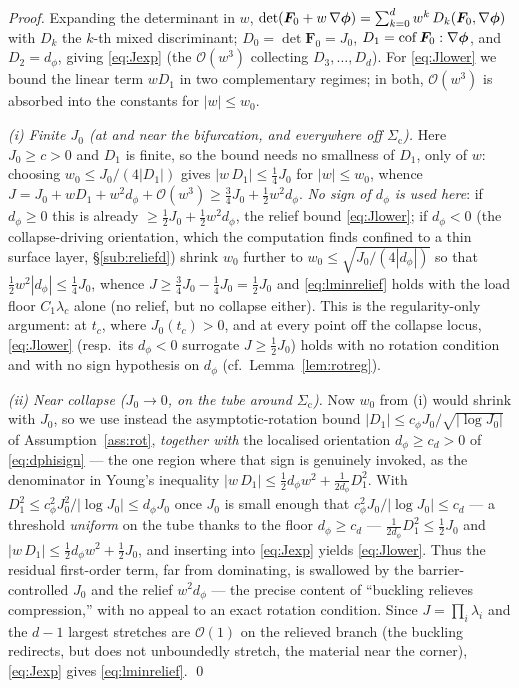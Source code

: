 \begin{proof}
    Expanding the determinant in $w$, $\det(\bm{F}_0+w\,\nabla\bm{\phi})=\sum_{k=0}^{d}w^k\,D_k(\bm{F}_0,\nabla\bm{\phi})$
    with $D_k$ the $k$-th mixed discriminant; $D_0=\det\bm{F}_0=J_0$, $D_1=\operatorname{cof}\bm{F}_0:\nabla\bm{\phi}$, and
    $D_2=d_\phi$, giving \eqref{eq:Jexp} (the $\mathcal{O}(w^3)$ collecting $D_3,\dots,D_d$). For \eqref{eq:Jlower} we
    bound the linear term $wD_1$ in two complementary regimes; in both, $\mathcal{O}(w^3)$ is absorbed into the constants
    for $|w|\le w_0$.

    \emph{(i) Finite $J_0$ (at and near the bifurcation, and everywhere off $\Sigma_{\mathrm{c}}$).} Here $J_0\ge c>0$ and
    $D_1$ is finite, so the bound needs no smallness of $D_1$, only of $w$: choosing $w_0\le J_0/(4|D_1|)$ gives
    $|w\,D_1|\le\tfrac14 J_0$ for $|w|\le w_0$, whence $J = J_0 + w D_1 + w^2 d_\phi+\mathcal{O}(w^3)\ge \tfrac34 J_0 +
    \tfrac12 w^2 d_\phi$. \emph{No sign of $d_\phi$ is used here}: if $d_\phi\ge0$ this is already $\ge\tfrac12
    J_0+\tfrac12 w^2 d_\phi$, the relief bound \eqref{eq:Jlower}; if $d_\phi<0$ (the collapse-driving orientation, which the
    computation finds confined to a thin surface layer, \S\ref{sub:reliefd}) shrink $w_0$ further to $w_0\le\sqrt{J_0/(4
    |d_\phi|)}$ so that $\tfrac12 w^2|d_\phi|\le\tfrac14 J_0$, whence $J\ge\tfrac34 J_0-\tfrac14 J_0=\tfrac12 J_0$ and
    \eqref{eq:lminrelief} holds with the load floor $C_1\lambda_c$ alone (no relief, but no collapse either). This is the
    regularity-only argument: at $t_c$, where $J_0(t_c)>0$, and at every point off the collapse locus, \eqref{eq:Jlower}
    (resp.\ its $d_\phi<0$ surrogate $J\ge\tfrac12 J_0$) holds with no rotation condition and with no sign hypothesis on
    $d_\phi$ (cf.\ Lemma~\ref{lem:rotreg}).

    \emph{(ii) Near collapse ($J_0\to0$, on the tube around $\Sigma_{\mathrm{c}}$).} Now $w_0$ from (i) would shrink with
    $J_0$, so we use instead the asymptotic-rotation bound $|D_1|\le c_\phi J_0/\sqrt{|\log J_0|}$ of
    Assumption~\ref{ass:rot}, \emph{together with} the localised orientation $d_\phi\ge c_d>0$ of \eqref{eq:dphisign} --- the one
    region where that sign is genuinely invoked, as the denominator in Young's inequality
    $|w\,D_1|\le \tfrac12 d_\phi w^2 + \tfrac1{2d_\phi}D_1^2$. With $D_1^2\le c_\phi^2 J_0^2/|\log J_0|\le d_\phi J_0$
    once $J_0$ is small enough that $c_\phi^2 J_0/|\log J_0|\le c_d$ --- a threshold \emph{uniform} on the tube thanks
    to the floor $d_\phi\ge c_d$ --- $\tfrac1{2d_\phi}D_1^2\le\tfrac12 J_0$ and
    $|w\,D_1|\le \tfrac12 d_\phi w^2+\tfrac12 J_0$, and
    inserting into \eqref{eq:Jexp} yields \eqref{eq:Jlower}. Thus the residual first-order term, far from dominating, is
    swallowed by the barrier-controlled $J_0$ and the relief $w^2 d_\phi$ --- the precise content of ``buckling relieves
    compression,'' with no appeal to an exact rotation condition. Since $J=\prod_i\lambda_i$ and the $d-1$ largest stretches are
    $\mathcal{O}(1)$ on the relieved branch (the buckling redirects, but does not unboundedly stretch, the material near
    the corner), \eqref{eq:Jexp} gives \eqref{eq:lminrelief}. \qed
\end{proof}

